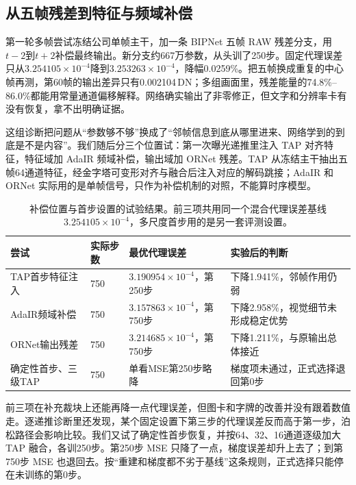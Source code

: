 \documentclass[11pt,a4paper,UTF8,fontset=fandol]{ctexart}
\newcommand{\dn}{\ensuremath{\,\mathrm{DN}}}
\begin{document}
\subsection{从五帧残差到特征与频域补偿}

第一轮多帧尝试冻结公司单帧主干，加一条 BIPNet 五帧 RAW 残差分支，用$t-2$到$t+2$补偿最终输出。新分支约667万参数，从头训了250步。固定代理误差只从$3.254105\times10^{-4}$降到$3.253263\times10^{-4}$，降幅0.0259\%。把五帧换成重复的中心帧再测，第60帧的输出差异只有0.002104\dn；多组画面里，残差能量的74.8\%--86.0\%都能用常量通道偏移解释。网络确实输出了非零修正，但文字和分辨率卡有没有恢复，拿不出明确证据。

这组诊断把问题从“参数够不够”换成了“邻帧信息到底从哪里进来、网络学到的到底是不是内容”。我们随后分三个位置试：第一次曝光递推里注入 TAP 对齐特征，特征域加 AdaIR 频域补偿，输出域加 ORNet 残差。TAP 从冻结主干抽出五帧64通道特征，经金字塔可变形对齐与融合后注入对应的解码跳接；AdaIR 和 ORNet 实际用的是单帧信号，只作为补偿机制的对照，不能算时序模型。

\begin{table}[!htbp]
\centering\small
\caption{补偿位置与首步设置的试验结果。前三项共用同一个混合代理误差基线$3.254105\times10^{-4}$，多尺度首步用的是另一套评测设置。}
\label{tab:djc_pilots}
\begin{tabular}{P{0.21\textwidth}P{0.12\textwidth}P{0.22\textwidth}P{0.33\textwidth}}
\toprule
尝试 & 实际步数 & 最优代理误差 & 实验后的判断 \\
\midrule
TAP首步特征注入 & 750 & $3.190954\times10^{-4}$，第250步 & 下降1.941\%，邻帧作用仍弱 \\
AdaIR频域补偿 & 750 & $3.157863\times10^{-4}$，第750步 & 下降2.958\%，视觉细节未形成稳定优势 \\
ORNet输出残差 & 750 & $3.214685\times10^{-4}$，第750步 & 下降1.211\%，与原输出总体接近 \\
确定性首步、三级TAP & 750 & 单看MSE第250步略降 & 梯度项未通过，正式选择退回第0步 \\
\bottomrule
\end{tabular}
\end{table}

前三项在补充裁块上还能再降一点代理误差，但图卡和字牌的改善并没有跟着数值走。逐递推诊断里还发现，某个固定设置下第三步的代理误差反而高于第一步，泊松路径会影响比较。我们又试了确定性首步恢复，并按64、32、16通道逐级加大 TAP 融合，各训250步。第250步 MSE 只降了一点，梯度误差却升上去了；到第750步 MSE 也退回去。按“重建和梯度都不劣于基线”这条规则，正式选择只能停在未训练的第0步。
\end{document}
